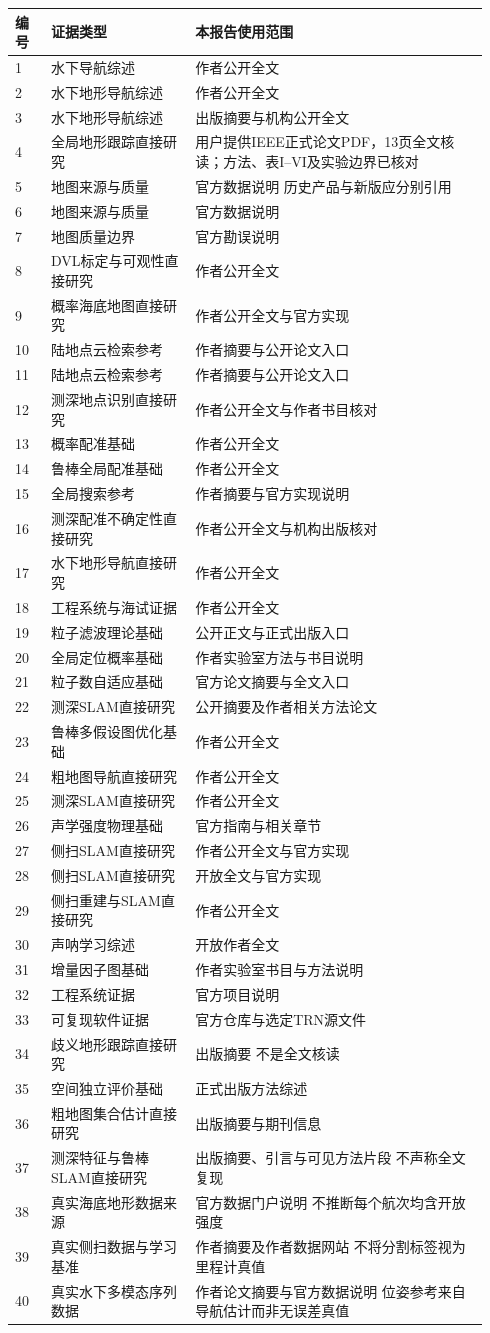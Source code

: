 \begin{longtable}[]{@{}p{0.07\linewidth}p{0.29\linewidth}p{0.58\linewidth}@{}}
\toprule
编号 & 证据类型 & 本报告使用范围\tabularnewline
\midrule
\endhead
1 & 水下导航综述 & 作者公开全文\tabularnewline
2 & 水下地形导航综述 & 作者公开全文\tabularnewline
3 & 水下地形导航综述 & 出版摘要与机构公开全文\tabularnewline
4 & 全局地形跟踪直接研究 & 用户提供IEEE正式论文PDF，13页全文核读；方法、表I--VI及实验边界已核对\tabularnewline
5 & 地图来源与质量 & 官方数据说明 历史产品与新版应分别引用\tabularnewline
6 & 地图来源与质量 & 官方数据说明\tabularnewline
7 & 地图质量边界 & 官方勘误说明\tabularnewline
8 & DVL标定与可观性直接研究 & 作者公开全文\tabularnewline
9 & 概率海底地图直接研究 & 作者公开全文与官方实现\tabularnewline
10 & 陆地点云检索参考 & 作者摘要与公开论文入口\tabularnewline
11 & 陆地点云检索参考 & 作者摘要与公开论文入口\tabularnewline
12 & 测深地点识别直接研究 & 作者公开全文与作者书目核对\tabularnewline
13 & 概率配准基础 & 作者公开全文\tabularnewline
14 & 鲁棒全局配准基础 & 作者公开全文\tabularnewline
15 & 全局搜索参考 & 作者摘要与官方实现说明\tabularnewline
16 & 测深配准不确定性直接研究 & 作者公开全文与机构出版核对\tabularnewline
17 & 水下地形导航直接研究 & 作者公开全文\tabularnewline
18 & 工程系统与海试证据 & 作者公开全文\tabularnewline
19 & 粒子滤波理论基础 & 公开正文与正式出版入口\tabularnewline
20 & 全局定位概率基础 & 作者实验室方法与书目说明\tabularnewline
21 & 粒子数自适应基础 & 官方论文摘要与全文入口\tabularnewline
22 & 测深SLAM直接研究 & 公开摘要及作者相关方法论文\tabularnewline
23 & 鲁棒多假设图优化基础 & 作者公开全文\tabularnewline
24 & 粗地图导航直接研究 & 作者公开全文\tabularnewline
25 & 测深SLAM直接研究 & 作者公开全文\tabularnewline
26 & 声学强度物理基础 & 官方指南与相关章节\tabularnewline
27 & 侧扫SLAM直接研究 & 作者公开全文与官方实现\tabularnewline
28 & 侧扫SLAM直接研究 & 开放全文与官方实现\tabularnewline
29 & 侧扫重建与SLAM直接研究 & 作者公开全文\tabularnewline
30 & 声呐学习综述 & 开放作者全文\tabularnewline
31 & 增量因子图基础 & 作者实验室书目与方法说明\tabularnewline
32 & 工程系统证据 & 官方项目说明\tabularnewline
33 & 可复现软件证据 & 官方仓库与选定TRN源文件\tabularnewline
34 & 歧义地形跟踪直接研究 & 出版摘要 不是全文核读\tabularnewline
35 & 空间独立评价基础 & 正式出版方法综述\tabularnewline
36 & 粗地图集合估计直接研究 & 出版摘要与期刊信息\tabularnewline
37 & 测深特征与鲁棒SLAM直接研究 & 出版摘要、引言与可见方法片段 不声称全文复现\tabularnewline
38 & 真实海底地形数据来源 & 官方数据门户说明 不推断每个航次均含开放强度\tabularnewline
39 & 真实侧扫数据与学习基准 & 作者摘要及作者数据网站 不将分割标签视为里程计真值\tabularnewline
40 & 真实水下多模态序列数据 & 作者论文摘要与官方数据说明 位姿参考来自导航估计而非无误差真值\tabularnewline
\bottomrule
\end{longtable}
